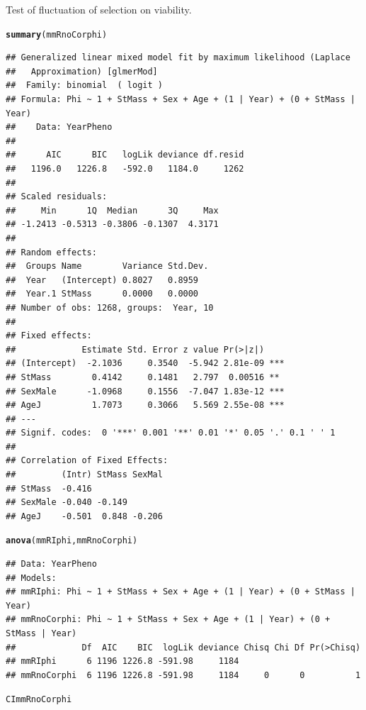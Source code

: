 \documentclass{article}\usepackage[]{graphicx}\usepackage[]{color}
\makeatletter
\newcommand{\hlstd}[1]{\textcolor[rgb]{0.345,0.345,0.345}{#1}}%
\newcommand{\hlkwd}[1]{\textcolor[rgb]{0.737,0.353,0.396}{\textbf{#1}}}%
\newenvironment{kframe}{%
 \def\at@end@of@kframe{}%
 \ifinner\ifhmode%
  \def\at@end@of@kframe{\end{minipage}}%
  \begin{minipage}{\columnwidth}%
 \fi\fi%
 \def\FrameCommand##1{\hskip\@totalleftmargin \hskip-\fboxsep
 \colorbox{shadecolor}{##1}\hskip-\fboxsep
     \hskip-\linewidth \hskip-\@totalleftmargin \hskip\columnwidth}%
 \MakeFramed {\advance\hsize-\width
   \@totalleftmargin\z@ \linewidth\hsize
   \@setminipage}}%
 {\par\unskip\endMakeFramed%
 \at@end@of@kframe}
\newenvironment{knitrout}{}{} %
\makeatother
\begin{document}
Test of fluctuation of selection on viability.
\begin{knitrout}
\color{fgcolor}\begin{kframe}
\begin{alltt}
\hlkwd{summary}\hlstd{(mmRnoCorphi)}
\end{alltt}
\begin{verbatim}
## Generalized linear mixed model fit by maximum likelihood (Laplace
##   Approximation) [glmerMod]
##  Family: binomial  ( logit )
## Formula: Phi ~ 1 + StMass + Sex + Age + (1 | Year) + (0 + StMass | Year)
##    Data: YearPheno
## 
##      AIC      BIC   logLik deviance df.resid 
##   1196.0   1226.8   -592.0   1184.0     1262 
## 
## Scaled residuals: 
##     Min      1Q  Median      3Q     Max 
## -1.2413 -0.5313 -0.3806 -0.1307  4.3171 
## 
## Random effects:
##  Groups Name        Variance Std.Dev.
##  Year   (Intercept) 0.8027   0.8959  
##  Year.1 StMass      0.0000   0.0000  
## Number of obs: 1268, groups:  Year, 10
## 
## Fixed effects:
##             Estimate Std. Error z value Pr(>|z|)    
## (Intercept)  -2.1036     0.3540  -5.942 2.81e-09 ***
## StMass        0.4142     0.1481   2.797  0.00516 ** 
## SexMale      -1.0968     0.1556  -7.047 1.83e-12 ***
## AgeJ          1.7073     0.3066   5.569 2.55e-08 ***
## ---
## Signif. codes:  0 '***' 0.001 '**' 0.01 '*' 0.05 '.' 0.1 ' ' 1
## 
## Correlation of Fixed Effects:
##         (Intr) StMass SexMal
## StMass  -0.416              
## SexMale -0.040 -0.149       
## AgeJ    -0.501  0.848 -0.206
\end{verbatim}
\begin{alltt}
\hlkwd{anova}\hlstd{(mmRIphi,mmRnoCorphi)}
\end{alltt}
\begin{verbatim}
## Data: YearPheno
## Models:
## mmRIphi: Phi ~ 1 + StMass + Sex + Age + (1 | Year) + (0 + StMass | Year)
## mmRnoCorphi: Phi ~ 1 + StMass + Sex + Age + (1 | Year) + (0 + StMass | Year)
##             Df  AIC    BIC  logLik deviance Chisq Chi Df Pr(>Chisq)
## mmRIphi      6 1196 1226.8 -591.98     1184                        
## mmRnoCorphi  6 1196 1226.8 -591.98     1184     0      0          1
\end{verbatim}
\begin{alltt}
\hlstd{CImmRnoCorphi}
\end{alltt}


{\ttfamily\noindent\bfseries\color{errorcolor}{\#\# Error in eval(expr, envir, enclos): objet 'CImmRnoCorphi' introuvable}}\end{kframe}
\end{knitrout}
\end{document}
